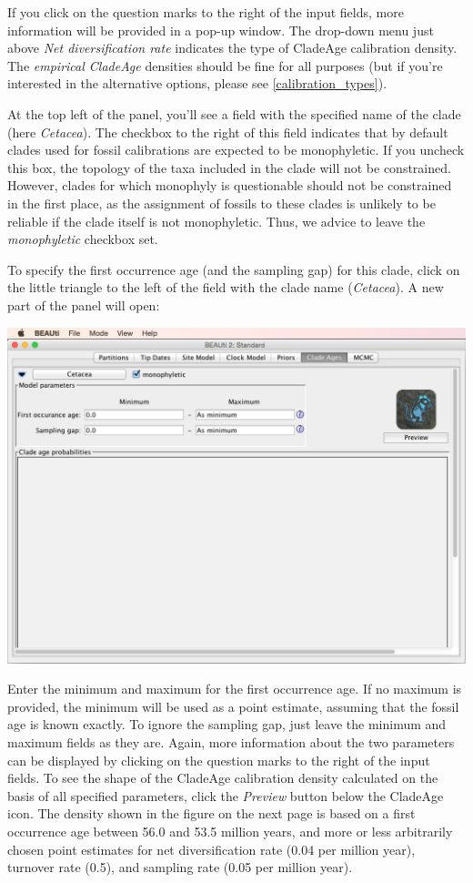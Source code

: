 \documentclass{article}
\begin{document}
If you click on the question marks to the right of the input fields, more information will be provided in a pop-up window. The drop-down menu just above \emph{Net diversification rate} indicates the type of CladeAge calibration density. The \emph{empirical CladeAge} densities should be fine for all purposes (but if you're interested in the alternative options, please see \ref{calibration_types}).

At the top left of the panel, you'll see a field with the specified name of the clade (here \emph{Cetacea}). The checkbox to the right of this field indicates that by default clades used for fossil calibrations are expected to be monophyletic. If you uncheck this box, the topology of the taxa included in the clade will not be constrained. However, clades for which monophyly is questionable should not be constrained in the first place, as the assignment of fossils to these clades is unlikely to be reliable if the clade itself is not monophyletic. Thus, we advice to leave the \emph{monophyletic} checkbox set.

To specify the first occurrence age (and the sampling gap) for this clade, click on the little triangle to the left of the field with the clade name (\emph{Cetacea}). A new part of the panel will open:

\begin{center}\includegraphics[width=\textwidth]{fig9.png}\end{center}

\noindent
Enter the minimum and maximum for the first occurrence age. If no maximum is provided, the minimum will be used as a point estimate, assuming that the fossil age is known exactly. To ignore the sampling gap, just leave the minimum and maximum fields as they are. Again, more information about the two parameters can be displayed by clicking on the question marks to the right of the input fields. To see the shape of the CladeAge calibration density calculated on the basis of all specified parameters, click the \emph{Preview} button below the CladeAge icon. The density shown in the figure on the next page is based on a first occurrence age between 56.0 and 53.5 million years, and more or less arbitrarily chosen point estimates for net diversification rate (0.04 per million year), turnover rate (0.5), and sampling rate (0.05 per million year).
\end{document}
